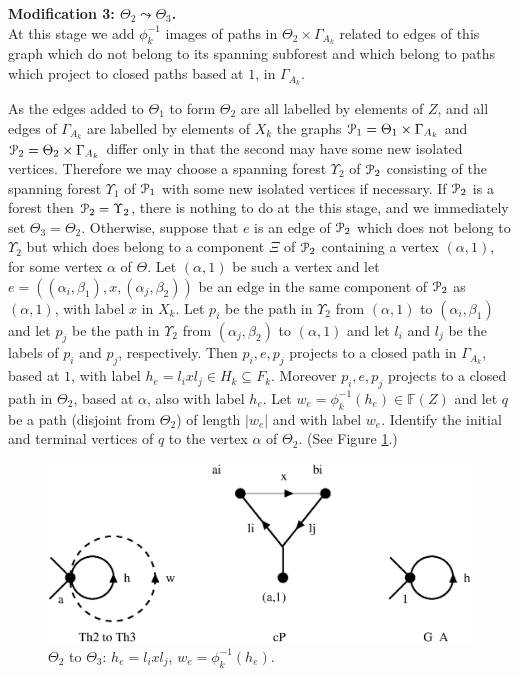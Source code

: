\documentclass[a4paper,12pt]{article}
\renewcommand{\a}{\alpha }
\renewcommand{\b}{\beta }
\newcommand{\G}{\Gamma }
\newcommand{\T}{\Theta }
\newcommand{\U}{\Upsilon }
\newcommand{\cP}{{\cal{P}}}
\numberwithin{equation}{section}
\numberwithin{figure}{section}
\newcommand{\FF}{\ensuremath{\mathbb{F}}}
\begin{document}
\noindent\textbf{Modification 3: $\T_2\leadsto \T_3$.}\\
At this stage we add $\phi_k^{-1}$ images of paths in $\T_2\times
\G_{A_k}$ related to edges of this graph which do not belong to
its spanning subforest and which belong to paths which project 
to closed paths 
based at $1$, in $\G_{A_k}$.

As the edges added to $\T_1$ to form $\T_2$ are all labelled by elements
of $Z$, and all edges of $\G_{A_k}$ are labelled by elements of $X_k$
the graphs $\cP_1=\T_1\times \G_{A_k}$ and $\cP_2=\T_2\times \G_{A_k}$ differ only
in that the second may have some new isolated vertices. Therefore we may
choose a spanning forest $\U_2$ of $\cP_2$ consisting of the spanning
forest $\U_1$ of $\cP_1$ with some new isolated vertices if necessary.
If $\cP_2$ is a forest then
$\cP_2=\U_2$, there is nothing to do at the
this stage, and we immediately set $\T_3=\T_2$. Otherwise, suppose
that $e$ is an edge of $\cP_2$ which does not belong to $\U_2$ but
which does belong to a component $\Xi$  of $\cP_2$ containing a
vertex $(\a,1)$, for some vertex $\a$ of $\T$. Let $(\a,1)$ be
such a vertex and let $e=((\a_i,\b_1), x, (\a_j,\b_2))$ be an edge
in the same component of $\cP_2$ as $(\a,1)$,
 with label $x$ in $X_k$.
 Let $p_i$ be
the path in $\U_2$ from $(\a,1)$ to $(\a_i,\b_1)$ and let $p_j$ be
the path in $\U_2 $ from  $(\a_j,\b_2)$ to $(\a,1)$ and let $l_i$
and $l_j$ be the labels of $p_i$ and $p_j$, respectively. Then
$p_i,e,p_j$ projects to a closed path in $\G_{A_k}$, based at $1$,
with label $h_e=l_i x l_j \in H_k\subseteq F_k$. Moreover
$p_i,e,p_j$ projects to a closed path in $\T_2$, based at $\a$,
also with label $h_e$. Let $w_e=\phi_k^{-1}(h_e) \in \FF(Z)$ and let
$q$ be a path (disjoint from $\T_2$) of length $|w_e|$ and with
label $w_e$. Identify the initial and terminal vertices of $q$ to
the vertex  $\a$ of $\Theta_2$. (See Figure \ref{fig:alg2-3}.)
\begin{figure}
\begin{center}
\psfrag{a}{$\a$}
\psfrag{b}{$\b$}
\psfrag{ai}{$(\a_i,\b_1)$}
\psfrag{bi}{$(\a_j,\b_2)$}
\psfrag{(a,1)}{$(\a,1)$}
\psfrag{Th2 to Th3}{$\T_2\leadsto \T_3$}
\psfrag{cP}{$\cP_2$}
\psfrag{G_A}{$\G_{A_k}$}
\includegraphics[scale=.5]{alg2-3.eps}
\end{center}
\caption{$\Theta_2$ to $\Theta_3$: $h_e=l_ixl_j$,
$w_e=\phi_k^{-1}(h_e)$.}\label{fig:alg2-3}
\end{figure}
\end{document}
